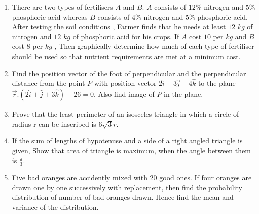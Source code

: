\documentclass{article}
\begin{document}
\begin{enumerate}
 \item There are two types of fertilisers $A$ and $B$. $A$ consists of $12\%$ nitrogen and $5\%$ phosphoric acid whereas $B$ consists of $4\%$ nitrogen and $5\%$ phosphoric acid. After testing the  soil conditions , Farmer finds that he needs at least $12$ $kg$ of nitrogen and $12$ $kg$ of phosphoric acid for his crops. If $A$ cost \rupee $10$ per $kg$ and $B$ cost \rupee $8$ per $kg$ , Then graphically determine how much of each type of fertiliser should be used so that nutrient requirements are met at a minimum cost.  
\item Find the position vector of the foot of perpendicular and the perpendicular distance from the point $P$ with position vector $ 2\hat{i}+3\hat{j}+4\hat{k} $ to the plane $\overrightarrow{r}.(2\hat{i}+\hat{j}+3\hat{k})-26 =0$. Also find image of $P$ in the plane.
 \item Prove that the least perimeter of an isosceles triangle in which a circle of radius r can be inscribed is $6\sqrt{3}r$.
 \item If the sum of lengths of hypotenuse and a side of a right angled triangle is given, Show that area of triangle is maximum, when the angle between them is $\frac{\pi}{3}$.
 \item Five bad oranges are accidently mixed with $20$ good ones. If four oranges are drawn one by one successively with replacement, then find the probability distribution of number of bad oranges drawn. Hence find the mean and variance of the distribution.
\end{enumerate}
\end{document}
